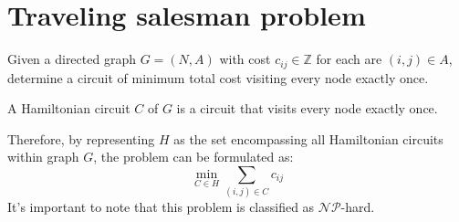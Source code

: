 \section{Traveling salesman problem}

Given a directed graph $G=(N,A)$ with cost $c_{ij} \in \mathbb{Z}$ for each are $(i,j) \in A$, determine a circuit of minimum total cost visiting every node exactly once. 
\begin{definition}
    A Hamiltonian circuit $C$ of $G$ is a circuit that visits every node exactly once. 
\end{definition}
Therefore, by representing $H$ as the set encompassing all Hamiltonian circuits within graph $G$, the problem can be formulated as:
\[\min_{C \in H}{\sum_{(i,j) \in C}{c_{ij}}}\]
It's important to note that this problem is classified as $\mathcal{N}\mathcal{P}$-hard. 
